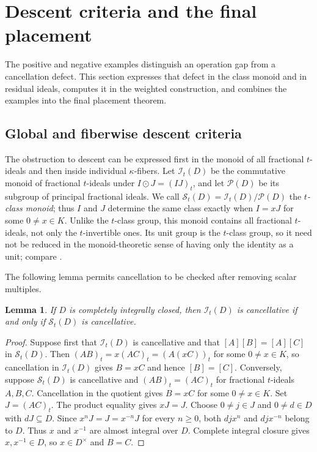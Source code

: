 \documentclass[11pt]{amsart}
\newtheorem{lemma}[lemma]{Lemma}
\theoremstyle{definition}
\theoremstyle{remark}
\newcommand{\It}{\mathcal I_t}
\newcommand{\Prin}{\mathcal P}
\newcommand{\Ctred}{\mathcal S_t}
\begin{document}
\section{Descent criteria and the final placement}\label{sec:criteria}

The positive and negative examples distinguish an operation gap from a
cancellation defect.  This section expresses that defect in the class
monoid and in residual ideals, computes it in the weighted construction,
and combines the examples into the final placement theorem.

\subsection{Global and fiberwise descent criteria}

The obstruction to descent can be expressed first in the monoid of all
fractional $t$-ideals and then inside individual $\kappa$-fibers.  Let
$\It(D)$ be the commutative monoid of fractional $t$-ideals under
$I\odot J=(IJ)_t$, and let $\Prin(D)$ be its subgroup of principal fractional
ideals.  We call
$\Ctred(D)=\It(D)/\Prin(D)$ the \emph{$t$-class monoid}; thus
$I$ and $J$ determine the same class exactly when $I=xJ$ for some
$0\ne x\in K$.  Unlike the $t$-class group, this monoid contains all fractional
$t$-ideals, not only the $t$-invertible ones.  Its unit group is the
$t$-class group, so it need not be reduced in the monoid-theoretic sense
of having only the identity as a unit; compare \cite{KimPark}.

The following lemma permits cancellation to be checked after removing scalar
multiples.

\begin{lemma}\label{lem:reduced}
If $D$ is completely integrally closed, then $\It(D)$ is cancellative if and
only if $\Ctred(D)$ is cancellative.
\end{lemma}

\begin{proof}
Suppose first that $\It(D)$ is cancellative and that
$[A][B]=[A][C]$ in $\Ctred(D)$.  Then
$(AB)_t=x(AC)_t=(A(xC))_t$ for some $0\ne x\in K$, so cancellation in
$\It(D)$ gives $B=xC$ and hence $[B]=[C]$.  Conversely, suppose
$\Ctred(D)$ is cancellative and $(AB)_t=(AC)_t$ for fractional $t$-ideals
$A,B,C$.  Cancellation in the
quotient gives $B=xC$ for some $0\ne x\in K$.  Set $J=(AC)_t$.  The product
equality gives $xJ=J$.  Choose $0\ne j\in J$ and $0\ne d\in D$ with
$dJ\subseteq D$.  Since $x^nJ=J=x^{-n}J$ for every $n\geq0$, both
$djx^n$ and $djx^{-n}$ belong to $D$.  Thus $x$ and $x^{-1}$ are almost
integral over $D$.  Complete integral closure gives $x,x^{-1}\in D$, so
$x\in D^\times$ and $B=C$.
\end{proof}
\end{document}
